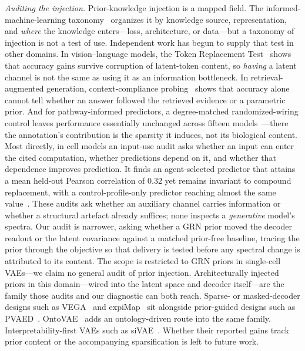 \documentclass[11pt,a4paper]{article}
\begin{document}
\emph{Auditing the injection.} Prior-knowledge injection is a mapped field. The informed-machine-learning taxonomy~\cite{vonrueden2023} organizes it by knowledge source, representation, and \emph{where} the knowledge enters---loss, architecture, or data---but a taxonomy of injection is not a test of use. Independent work has begun to supply that test in other domains. In vision--language models, the Token Replacement Test~\cite{ablate2026} shows that accuracy gains survive corruption of latent-token content, so \emph{having} a latent channel is not the same as using it as an information bottleneck. In retrieval-augmented generation, context-compliance probing~\cite{cdd2026} shows that accuracy alone cannot tell whether an answer followed the retrieved evidence or a parametric prior. And for pathway-informed predictors, a degree-matched randomized-wiring control leaves performance essentially unchanged across fifteen models~\cite{caranzano2026}---there the annotation's contribution is the sparsity it induces, not its biological content. Most directly, in cell models an input-use audit asks whether an input can enter the cited computation, whether predictions depend on it, and whether that dependence improves prediction. It finds an agent-selected predictor that attains a mean held-out Pearson correlation of 0.32 yet remains invariant to compound replacement, with a control-profile-only predictor reaching almost the same value~\cite{cellaudit2026}. These audits ask whether an auxiliary channel carries information or whether a structural artefact already suffices; none inspects a \emph{generative} model's spectra. Our audit is narrower, asking whether a GRN prior moved the decoder readout or the latent covariance against a matched prior-free baseline, tracing the prior through the objective so that delivery is tested before any spectral change is attributed to its content. The scope is restricted to GRN priors in single-cell VAEs---we claim no general audit of prior injection. Architecturally injected priors in this domain---wired into the latent space and decoder itself---are the family those audits and our diagnostic can both reach. Sparse- or masked-decoder designs such as VEGA~\cite{vega} and expiMap~\cite{expimap2023} sit alongside prior-guided designs such as PVAED~\cite{pvaed2026}. OntoVAE~\cite{ontovae2023} adds an ontology-driven route into the same family. Interpretability-first VAEs such as siVAE~\cite{sivae2023}. Whether their reported gains track prior content or the accompanying sparsification is left to future work.
\end{document}

